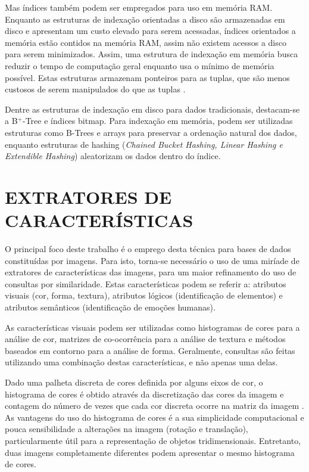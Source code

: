 Mas índices também podem ser empregados para uso em memória RAM. Enquanto as estruturas de indexação orientadas a disco são armazenadas em disco e apresentam
um custo elevado para serem acessadas, índices orientados a memória estão contidos na memória RAM, assim não existem acessos
a disco para serem minimizados. Assim, uma estrutura de indexação em memória busca reduzir o tempo de computação geral enquanto usa
o mínimo de memória possível. Estas estruturas armazenam ponteiros para as tuplas, que são menos custosos de serem manipulados do que as tuplas \cite{Lehman1986}.\par
				
Dentre as estruturas de indexação em disco para dados tradicionais, destacam-se a B$^{+}$-Tree e índices bitmap. Para indexação em memória,
podem ser utilizadas estruturas como B-Trees e arrays para preservar a ordenação natural dos dados, enquanto estruturas de hashing
(\textit{Chained Bucket Hashing, Linear Hashing e Extendible Hashing}) aleatorizam os dados dentro do índice.

\section{EXTRATORES DE CARACTERÍSTICAS}
\label{sec:extcarac}
O principal foco deste trabalho é o emprego desta técnica para bases de dados constituídas por imagens. Para isto, torna-se necessário o uso de uma miríade de extratores de características
das imagens, para um maior refinamento do uso de consultas por similaridade. Estas características podem se referir a: atributos visuais (cor, forma, textura), atributos lógicos (identificação
de elementos) e atributos semânticos (identificação de emoções humanas).\par

As características visuais podem ser utilizadas como histogramas de cores para a análise de cor, matrizes de co-ocorrência para a análise de textura e
métodos baseados em contorno para a análise de forma. Geralmente, consultas são feitas utilizando uma combinação destas características, e não apenas uma delas.\par

Dado uma palheta discreta de cores definida por alguns eixos de cor, o histograma de cores é obtido através da discretização das cores da imagem e contagem
do número de vezes que cada cor discreta ocorre na matriz da imagem \cite{Swain1991}. As vantagens do uso do histograma de cores é a sua simplicidade computacional e pouca
sensibilidade a alterações na imagem (rotação e translação), particularmente útil para a representação de objetos tridimensionais. Entretanto, duas imagens completamente 
diferentes podem apresentar o mesmo histograma de cores.\par

